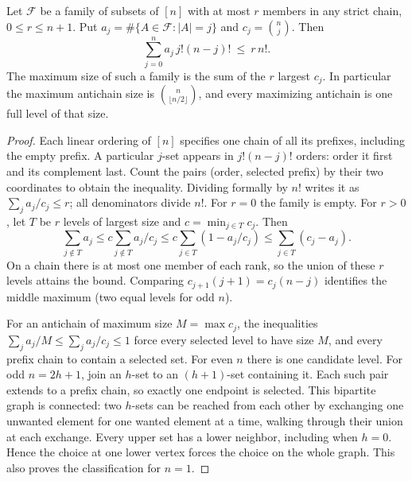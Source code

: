 \begin{theorem}\label{result40}
Let \(\mathcal F\) be a family of subsets of \([n]\) with at most \(r\)
members in any strict chain, \(0\le r\le n+1\). Put \(a_j=\#\{A\in
\mathcal F:|A|=j\}\) and \(c_j=\binom nj\). Then
\[
 \sum_{j=0}^n a_j\,j!(n-j)!\ \le\ r\,n!.
\]
The maximum size of such a family is the sum of the \(r\) largest
\(c_j\). In particular the maximum antichain size is
\(\binom n{\lfloor n/2\rfloor}\), and every maximizing antichain is
one full level of that size.
\end{theorem}
\begin{proof}
Each linear ordering of \([n]\) specifies one chain of all its prefixes,
including the empty prefix. A particular \(j\)-set appears in
\(j!(n-j)!\) orders: order it first and its complement last. Count
the pairs (order, selected prefix) by their two coordinates to obtain
the inequality. Dividing formally by \(n!\) writes it as
\(\sum_j a_j/c_j\le r\); all denominators divide \(n!\).
For \(r=0\) the family is empty. For \(r>0\), let \(T\) be \(r\) levels
of largest size and \(c=\min_{j\in T}c_j\). Then
\[
 \sum_{j\notin T}a_j
 \le c\sum_{j\notin T} a_j/c_j
 \le c\sum_{j\in T}(1-a_j/c_j)
 \le \sum_{j\in T}(c_j-a_j).
\]
On a chain there is at most one member of each rank, so the union of
these \(r\) levels attains the bound. Comparing \(c_{j+1}(j+1)=
c_j(n-j)\) identifies the middle maximum (two equal levels for odd \(n\)).

For an antichain of maximum size \(M=\max c_j\), the inequalities
\(\sum_j a_j/M\le\sum_j a_j/c_j\le1\) force every selected level
to have size \(M\), and every prefix chain to contain a selected set.
For even \(n\) there is one candidate level. For odd \(n=2h+1\),
join an \(h\)-set to an \((h+1)\)-set containing it. Each such pair
extends to a prefix chain, so exactly one endpoint is selected. This
bipartite graph is connected: two \(h\)-sets can be reached from each
other by exchanging one unwanted element for one wanted element at a
time, walking through their union at each exchange. Every upper set has
a lower neighbor, including when \(h=0\). Hence the choice at one lower
vertex forces the choice on the whole graph. This also proves the
classification for \(n=1\).
\end{proof}

